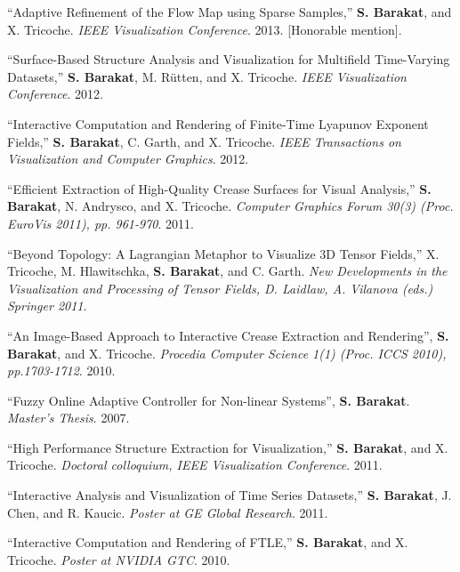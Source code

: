 \documentclass[10pt]{article}
\begin{document}
\begin{description}
	\item ``Adaptive Refinement of the Flow Map using Sparse Samples,'' \textbf{S. Barakat}, and X. Tricoche.
	\emph{IEEE Visualization Conference}. 2013. [Honorable mention].
	
	\item ``Surface-Based Structure Analysis and Visualization for Multifield Time-Varying Datasets,'' \textbf{S. Barakat}, M. Rütten, and X. Tricoche.
	\emph{IEEE Visualization Conference}. 2012.
	
	\item ``Interactive Computation and Rendering of Finite-Time Lyapunov Exponent Fields,'' \textbf{S. Barakat}, C. Garth, and X. Tricoche. \emph{IEEE Transactions on Visualization and Computer Graphics}. 2012.
	
	\item ``Efficient Extraction of High-Quality Crease Surfaces for Visual Analysis,'' \textbf{S. Barakat}, N. Andrysco, and X. Tricoche. \emph{Computer Graphics Forum 30(3) (Proc. EuroVis 2011), pp. 961-970}. 2011.
	
	\item ``Beyond Topology: A Lagrangian Metaphor to Visualize 3D Tensor Fields,'' X. Tricoche, M. Hlawitschka, \textbf{S. Barakat}, and C. Garth. \emph{New Developments in the Visualization and Processing of Tensor Fields, D. Laidlaw, A. Vilanova (eds.) Springer 2011}.
	
	\item ``An Image-Based Approach to Interactive Crease Extraction and Rendering'', \textbf{S. Barakat}, and X. Tricoche. \emph{Procedia Computer Science 1(1) (Proc. ICCS 2010), pp.1703-1712}. 2010.
	
	\item ``Fuzzy Online Adaptive Controller for Non-linear Systems'', \textbf{S. Barakat}. \emph{Master's Thesis}. 2007.
	
	\item ``High Performance Structure Extraction for Visualization,'' \textbf{S. Barakat}, and X. Tricoche.  \emph{Doctoral colloquium, IEEE Visualization Conference}. 2011.
	
	\item ``Interactive Analysis and Visualization of Time Series Datasets,'' \textbf{S. Barakat}, J. Chen, and R. Kaucic. \emph{Poster at GE Global Research}. 2011.
	
	\item ``Interactive Computation and Rendering of FTLE,'' \textbf{S. Barakat}, and X. Tricoche. \emph{Poster at NVIDIA GTC}. 2010.
	
\end{description}
\end{document}
